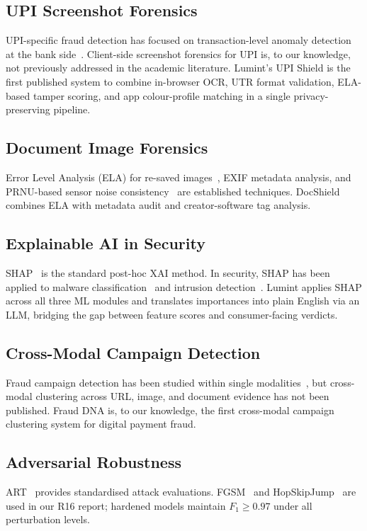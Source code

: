 \documentclass[conference]{IEEEtran}
\begin{document}
\subsection{UPI Screenshot Forensics}
\vspace{2mm}
UPI-specific fraud detection has focused on transaction-level anomaly
detection at the bank side~\cite{rbi2023framework}. Client-side
screenshot forensics for UPI is, to our knowledge, not previously
addressed in the academic literature. Lumint's UPI Shield is the
first published system to combine in-browser OCR, UTR format
validation, ELA-based tamper scoring, and app colour-profile matching
in a single privacy-preserving pipeline.

\subsection{Document Image Forensics}
\vspace{2mm}
Error Level Analysis (ELA) for re-saved images~\cite{krawetz2007},
EXIF metadata analysis, and PRNU-based sensor noise
consistency~\cite{fridrich2009} are established techniques. DocShield
combines ELA with metadata audit and creator-software tag analysis.

\subsection{Explainable AI in Security}
\vspace{2mm}
SHAP~\cite{lundberg2017} is the standard post-hoc XAI method. In
security, SHAP has been applied to malware
classification~\cite{imboden2017} and intrusion
detection~\cite{burns2021}. Lumint applies SHAP across all three ML
modules and translates importances into plain English via an LLM,
bridging the gap between feature scores and consumer-facing verdicts.

\subsection{Cross-Modal Campaign Detection}
\vspace{2mm}
Fraud campaign detection has been studied within single
modalities~\cite{le2009}, but cross-modal clustering across URL, image,
and document evidence has not been published. Fraud DNA is, to our
knowledge, the first cross-modal campaign clustering system for
digital payment fraud.

\subsection{Adversarial Robustness}
\vspace{2mm}
ART~\cite{nicolae2018} provides standardised attack evaluations.
FGSM~\cite{goodfellow2015} and HopSkipJump~\cite{chen2020} are used in
our R16 report; hardened models maintain $F_1{\geq}0.97$ under all
perturbation levels.
\end{document}
